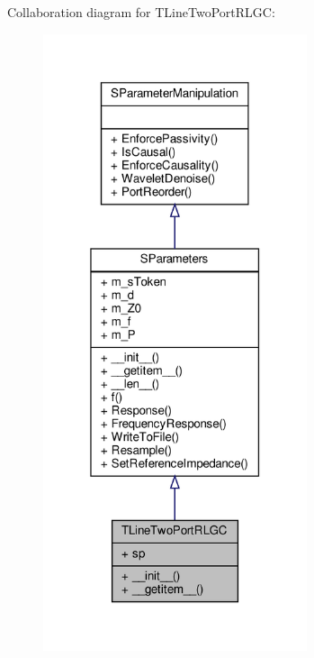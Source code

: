 Collaboration diagram for T\+Line\+Two\+Port\+R\+L\+GC\+:
\nopagebreak
\begin{figure}[H]
\begin{center}
\leavevmode
\includegraphics[width=220pt]{classSignalIntegrity_1_1SParameters_1_1Devices_1_1TLineTwoPortRLGC_1_1TLineTwoPortRLGC__coll__graph}
\end{center}
\end{figure}
